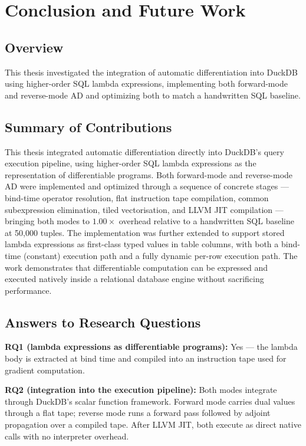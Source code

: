 \documentclass[12pt]{report}
\begin{document}

\chapter{Conclusion and Future Work}
\label{ch:conclusion}

\section{Overview}
This thesis investigated the integration of automatic differentiation into
DuckDB using higher-order SQL lambda expressions, implementing both
forward-mode and reverse-mode AD and optimizing both to match a handwritten
SQL baseline.

\section{Summary of Contributions}

This thesis integrated automatic differentiation directly into DuckDB's
query execution pipeline, using higher-order SQL lambda expressions as the
representation of differentiable programs. Both forward-mode and
reverse-mode AD were implemented and optimized through a sequence of
concrete stages --- bind-time operator resolution, flat instruction tape
compilation, common subexpression elimination, tiled vectorisation, and
LLVM JIT compilation --- bringing both modes to \(1.00\times\) overhead
relative to a handwritten SQL baseline at 50{,}000 tuples. The
implementation was further extended to support stored lambda expressions
as first-class typed values in table columns, with both a bind-time
(constant) execution path and a fully dynamic per-row execution path. The
work demonstrates that differentiable computation can be expressed and
executed natively inside a relational database engine without sacrificing
performance.

\section{Answers to Research Questions}

\textbf{RQ1 (lambda expressions as differentiable programs):} Yes — the
lambda body is extracted at bind time and compiled into an instruction tape
used for gradient computation.

\textbf{RQ2 (integration into the execution pipeline):} Both modes integrate
through DuckDB's scalar function framework. Forward mode carries dual values
through a flat tape; reverse mode runs a forward pass followed by adjoint
propagation over a compiled tape. After LLVM JIT, both execute as direct
native calls with no interpreter overhead.
\end{document}
